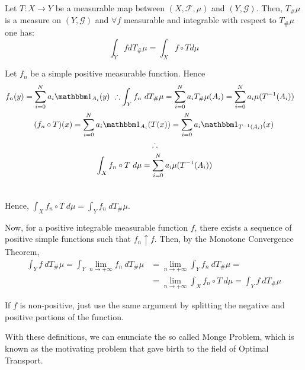 \begin{theorem}
  Let $T: X \to Y$ be a measurable map between
  $(X, \mathcal F, \mu)$ and $(Y, \mathcal G)$. Then,
  $T_\# \mu$ is a measure on $(Y, \mathcal G)$ and
  $\forall f$ measurable and integrable with respect to
  $T_\#\mu$ one has:
  \begin{equation}
    \int_Y f dT_\#\mu = \int_X f \circ T d\mu
  \end{equation}
  \label{thm:pushforward}
\end{theorem}
\begin{prf}
  Let $f_n$ be a simple positive measurable function. Hence
  \begin{equation*}
    \begin{multlined}
      f_n(y) = \sum^N_{i=0} a_i \mathbbm 1_{A_i}(y) \ \therefore
      \int_Y f_n \ dT_\# \mu =
      \sum^N_{i=0} a_i T_\# \mu(A_i) =
      \sum^N_{i=0} a_i \mu(T^{-1}(A_i) )
      \\
      (f_n\circ T)(x) =
      \sum^N_{i=0} a_i \mathbbm 1_{A_i}(T(x))=
      \sum^N_{i=0} a_i \mathbbm 1_{T^{-1}(A_i)}(x)
      \\
      \therefore
      \\
      \int_X f_n \circ T \ d\mu =
      \sum^N_{i=0} a_i \mu(T^{-1}(A_i) ) \\
    \end{multlined}
  \end{equation*}

  Hence, $\int_X f_n \circ T \ d\mu = \int_Y f_n \ dT_\# \mu$.

  Now, for a positive integrable measurable function
  $f$, there exists a sequence
  of positive simple functions such that $f_n \uparrow f$. Then,
  by the Monotone Convergence Theorem,
  \begin{align*}
    \int_Y f \ dT_\# \mu =
    \int_Y\lim_{n\to +\infty}  f_n \ dT_\# \mu & =
    \lim_{n\to +\infty} \int_Y f_n \ dT_\# \mu =                                                 \\
                                               & =\lim_{n\to +\infty}	\int_X f_n \circ T \ d\mu =
    \int_Y f \ dT_\# \mu
  \end{align*}

  If $f$ is non-positive, just use the same argument by splitting
  the negative and positive portions of the function.

\end{prf}

With these definitions, we can enunciate the so called Monge Problem,
which is known as the motivating problem that gave birth to the field
of Optimal Transport.

